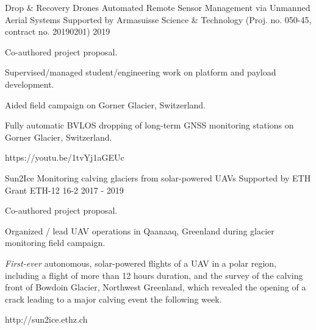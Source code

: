 \label{sec:proj}
\begin{cventries}

  \cvprojwideentry
  	{Drop \& Recovery Drones} %
  	{Automated Remote Sensor Management via Unmanned Aerial Systems} %
    {Supported by Armasuisse Science \& Technology (Proj. no. 050-45, contract no. 20190201)} %
    {2019} %
    {
      \begin{cvitems} %
        \item {Co-authored project proposal.}
        \item {Supervised/managed student/engineering work on platform and payload development.}
        \item {Aided field campaign on Gorner Glacier, Switzerland.}
        \item {Fully automatic BVLOS dropping of long-term GNSS monitoring stations on Gorner Glacier, Switzerland.}
      \end{cvitems}
    } %
    {https://youtu.be/1tvYj1aGEUc} %
    {\showprojectdescriptions}

  \cvprojwideentry
  	{Sun2Ice} %
  	{Monitoring calving glaciers from solar-powered UAVs} %
    {Supported by ETH Grant ETH-12 16-2} %
    {2017 - 2019} %
    {
      \begin{cvitems} %
        \item {Co-authored project proposal.}
        \item {Organized / lead UAV operations in Qaanaaq, Greenland during glacier monitoring field campaign.}
        \item {\emph{First-ever} autonomous, solar-powered flights of a UAV in a polar region, including a flight of more than 12 hours duration, and the survey of the calving front of Bowdoin Glacier, Northwest Greenland, which revealed the opening of a crack leading to a major calving event the following week.}
      \end{cvitems}
    } %
    {http://sun2ice.ethz.ch} %
    {\showprojectdescriptions}
    

\end{cventries}
